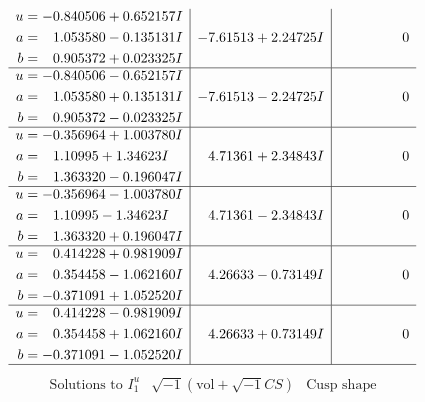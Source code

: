 \documentclass[1p]{elsarticle_modified}
\theoremstyle{definition}
\newcommand{\I}{\sqrt{-1}}
\begin{document}
$$\begin{array}{c|c|c}
\begin{aligned}
u &= -0.840506 + 0.652157 I \\
a &= \phantom{-}1.053580 - 0.135131 I \\
b &= \phantom{-}0.905372 + 0.023325 I\end{aligned}
 & -7.61513 + 2.24725 I & \phantom{-0.000000 } 0 \\ \hline\begin{aligned}
u &= -0.840506 - 0.652157 I \\
a &= \phantom{-}1.053580 + 0.135131 I \\
b &= \phantom{-}0.905372 - 0.023325 I\end{aligned}
 & -7.61513 - 2.24725 I & \phantom{-0.000000 } 0 \\ \hline\begin{aligned}
u &= -0.356964 + 1.003780 I \\
a &= \phantom{-}1.10995 + 1.34623 I \\
b &= \phantom{-}1.363320 - 0.196047 I\end{aligned}
 & \phantom{-}4.71361 + 2.34843 I & \phantom{-0.000000 } 0 \\ \hline\begin{aligned}
u &= -0.356964 - 1.003780 I \\
a &= \phantom{-}1.10995 - 1.34623 I \\
b &= \phantom{-}1.363320 + 0.196047 I\end{aligned}
 & \phantom{-}4.71361 - 2.34843 I & \phantom{-0.000000 } 0 \\ \hline\begin{aligned}
u &= \phantom{-}0.414228 + 0.981909 I \\
a &= \phantom{-}0.354458 - 1.062160 I \\
b &= -0.371091 + 1.052520 I\end{aligned}
 & \phantom{-}4.26633 - 0.73149 I & \phantom{-0.000000 } 0 \\ \hline\begin{aligned}
u &= \phantom{-}0.414228 - 0.981909 I \\
a &= \phantom{-}0.354458 + 1.062160 I \\
b &= -0.371091 - 1.052520 I\end{aligned}
 & \phantom{-}4.26633 + 0.73149 I & \phantom{-0.000000 } 0\\
 \hline 
 \end{array}$$\newpage$$\begin{array}{c|c|c}  
\text{Solutions to }I^u_{1}& \I (\text{vol} + \sqrt{-1}CS) & \text{Cusp shape}\\

\end{array}$$
\end{document}
